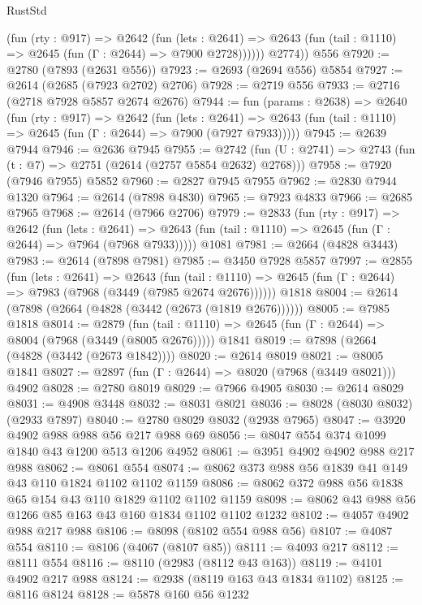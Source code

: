 \begin{lexlean}{RustStd}
\begin{coremodule}
            (fun (rty : @917) =>
            @2642
              (fun (lets : @2641) =>
              @2643 (fun (tail : @1110) => @2645 (fun (Γ : @2644) => @7900 @2728))))))
        @2774))
    @556
@7920 := @2780 (@7893 (@2631 @556))
@7923 := @2693 (@2694 @556) @5854
@7927 := @2614 (@2685 (@7923 @2702) @2706)
@7928 := @2719 @556
@7933 := @2716 (@2718 @7928 @5857 @2674 @2676)
@7944 := fun (params : @2638) =>
  @2640
    (fun (rty : @917) =>
    @2642
      (fun (lets : @2641) =>
      @2643 (fun (tail : @1110) => @2645 (fun (Γ : @2644) => @7900 (@7927 @7933)))))
@7945 := @2639 @7944
@7946 := @2636 @7945
@7955 := @2742 (fun (U : @2741) => @2743 (fun (t : @7) => @2751 (@2614 (@2757 @5854 @2632) @2768)))
@7958 := @7920 (@7946 @7955) @5852
@7960 := @2827 @7945 @7955
@7962 := @2830 @7944 @1320
@7964 := @2614 (@7898 @4830)
@7965 := @7923 @4833
@7966 := @2685 @7965
@7968 := @2614 (@7966 @2706)
@7979 := @2833
    (fun (rty : @917) =>
    @2642
      (fun (lets : @2641) =>
      @2643 (fun (tail : @1110) => @2645 (fun (Γ : @2644) => @7964 (@7968 @7933)))))
    @1081
@7981 := @2664 (@4828 @3443)
@7983 := @2614 (@7898 @7981)
@7985 := @3450 @7928 @5857
@7997 := @2855
    (fun (lets : @2641) =>
    @2643
      (fun (tail : @1110) => @2645 (fun (Γ : @2644) => @7983 (@7968 (@3449 (@7985 @2674 @2676))))))
    @1818
@8004 := @2614 (@7898 (@2664 (@4828 (@3442 (@2673 (@1819 @2676))))))
@8005 := @7985 @1818
@8014 := @2879
    (fun (tail : @1110) => @2645 (fun (Γ : @2644) => @8004 (@7968 (@3449 (@8005 @2676)))))
    @1841
@8019 := @7898 (@2664 (@4828 (@3442 (@2673 @1842))))
@8020 := @2614 @8019
@8021 := @8005 @1841
@8027 := @2897 (fun (Γ : @2644) => @8020 (@7968 (@3449 @8021))) @4902
@8028 := @2780 @8019
@8029 := @7966 @4905
@8030 := @2614 @8029
@8031 := @4908 @3448
@8032 := @8031 @8021
@8036 := @8028 (@8030 @8032) (@2933 @7897)
@8040 := @2780 @8029 @8032 (@2938 @7965)
@8047 := @3920 @4902 @988 @988 @56 @217 @988 @69
@8056 := @8047 @554 @374 @1099 @1840 @43 @1200 @513 @1206 @4952
@8061 := @3951 @4902 @4902 @988 @217 @988
@8062 := @8061 @554
@8074 := @8062 @373 @988 @56 @1839 @41 @149 @43 @110 @1824 @1102 @1102 @1159
@8086 := @8062 @372 @988 @56 @1838 @65 @154 @43 @110 @1829 @1102 @1102 @1159
@8098 := @8062 @43 @988 @56 @1266 @85 @163 @43 @160 @1834 @1102 @1102 @1232
@8102 := @4057 @4902 @988 @217 @988
@8106 := @8098 (@8102 @554 @988 @56)
@8107 := @4087 @554
@8110 := @8106 (@4067 (@8107 @85))
@8111 := @4093 @217
@8112 := @8111 @554
@8116 := @8110 (@2983 (@8112 @43 @163))
@8119 := @4101 @4902 @217 @988
@8124 := @2938 (@8119 @163 @43 @1834 @1102)
@8125 := @8116 @8124
@8128 := @5878 @160 @56 @1232

\end{coremodule}
\end{lexlean}
